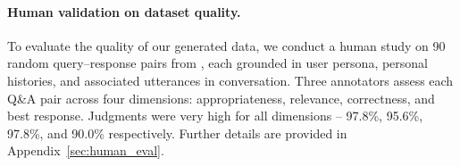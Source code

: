 



\paragraph{Human validation on dataset quality.}
To evaluate the quality of our generated data, we conduct a human study on 90 random query–response pairs from \datasetname, each grounded in user persona, personal histories, and associated utterances in conversation. Three annotators assess each Q\&A pair across four dimensions: appropriateness, relevance, correctness, and best response. Judgments were very high for all dimensions -- 97.8\%, 95.6\%, 97.8\%, and 90.0\% respectively. Further details are provided in Appendix~\ref{sec:human_eval}.
